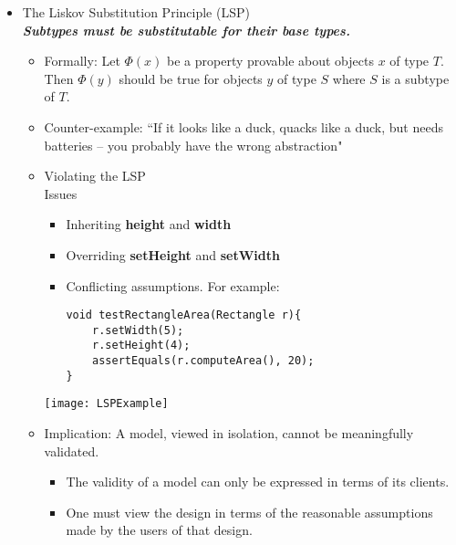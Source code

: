 \documentclass[11pt]{article}
\begin{document}
\begin{itemize}
	\item The Liskov Substitution Principle (LSP)\\
		\textbf{\emph{Subtypes must be substitutable for their base types.}}
		\begin{itemize}
			\item Formally: Let $ \Phi(x) $ be a property provable about objects $ x $ of type $ T $. Then $ \Phi(y) $ should be true for objects $ y $ of type $ S $ where $ S $ is a subtype of $ T $.
			\item Counter-example: ``If it looks like a duck, quacks like a duck, but needs batteries – you probably have the wrong abstraction"
			\item Violating the LSP\\
				Issues\\
				\begin{minipage}{0.6\textwidth}
					\begin{itemize}
						\item Inheriting \textbf{height} and \textbf{width}
						\item Overriding \textbf{setHeight} and \textbf{setWidth}
						\item Conflicting assumptions. For example:
\begin{Verbatim}
void testRectangleArea(Rectangle r){
	r.setWidth(5);
	r.setHeight(4);
	assertEquals(r.computeArea(), 20);
}
\end{Verbatim}
					\end{itemize}
				\end{minipage}
				\begin{minipage}{0.3\textwidth}
					\texttt{[image: LSPExample]}
				\end{minipage}

			\item Implication: A model, viewed in isolation, cannot be meaningfully validated.
				\begin{itemize}
					\item The validity of a model can only be expressed in terms of its clients.
					\item One must view the design in terms of the reasonable assumptions made by
					the users of that design.
				\end{itemize}
		\end{itemize}


\end{itemize}
\end{document}
